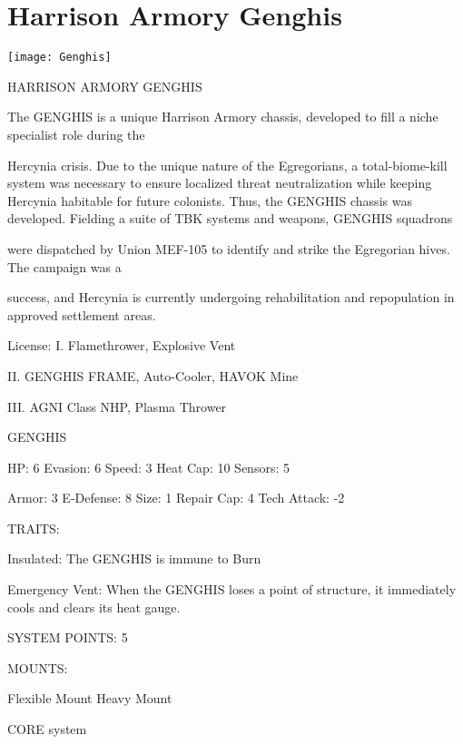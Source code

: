 \section{Harrison Armory Genghis}

\centering\texttt{[image: Genghis]}

                                  HARRISON ARMORY GENGHIS

The GENGHIS is a unique Harrison Armory chassis, developed to fill a niche specialist role during the

Hercynia crisis. Due to the unique nature of the Egregorians, a total-biome-kill system was necessary to
ensure localized threat neutralization while keeping Hercynia habitable for future colonists. Thus, the
GENGHIS chassis was developed. Fielding a suite of TBK systems and weapons, GENGHIS squadrons

were dispatched by Union MEF-105 to identify and strike the Egregorian hives. The campaign was a

success, and Hercynia is currently undergoing rehabilitation and repopulation in approved settlement areas.

                                                       License:
I. Flamethrower, Explosive Vent

II. GENGHIS FRAME, Auto-Cooler, HAVOK Mine

III. AGNI Class NHP, Plasma Thrower





                                                GENGHIS

HP: 6          Evasion: 6                            Speed: 3            Heat Cap: 10       Sensors: 5

Armor: 3       E-Defense: 8                          Size: 1             Repair Cap: 4      Tech Attack: -2

                                                  TRAITS:

Insulated: The GENGHIS is immune to Burn

Emergency Vent: When the GENGHIS loses a point of structure, it immediately cools and clears its
heat gauge.

                                            SYSTEM POINTS: 5

                                                 MOUNTS:

Flexible Mount                                        Heavy Mount

                                               CORE system

